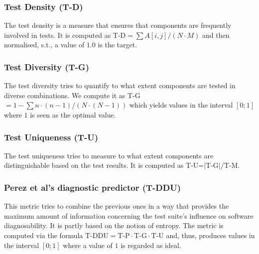 \subsubsection{Test Density (T-D)}

The test density is a measure that ensures that components are frequently
involved in tests. It is computed as T-D$=\sum{A[i,j]}/(N\cdot M)$ and then
normalised, s.t., a value of $1.0$ is the target.

\subsubsection{Test Diversity (T-G)}

The test diversity tries to quantify to what extent components are tested in
diverse combinations. We compute it as T-G$=1 - \sum{n \cdot (n-1)}/ (N \cdot
(N-1))$ which yields values in the interval $[0;1]$ where $1$ is seen as the
optimal value.

\subsubsection{Test Uniqueness (T-U)}

The test uniqueness tries to measure to what extent components are
distinguishable based on the test results. It is computed as T-U=$|\textrm{T-G}|
/ \textrm{T-M}$. 

\subsubsection{Perez et al's diagnostic predictor (T-DDU)}

This metric tries to combine the previous ones in a way that provides the
maximum amount of information concerning the test suite's influence on software
diagnosability. It is partly based on the notion of entropy. The metric is
computed via the formula $\textrm{T-DDU} = \textrm{T-P} \cdot \textrm{T-G} \cdot
\textrm{T-U}$ and, thus, produces values in the interval $[0;1]$ where a value
of $1$ is regarded as ideal.